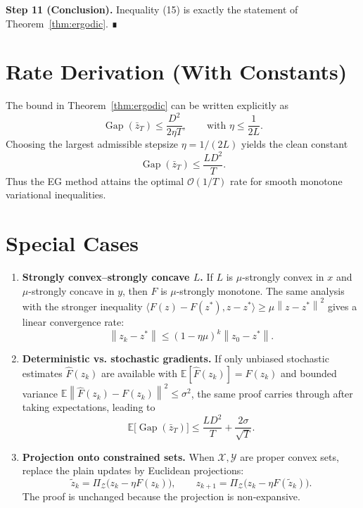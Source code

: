 \documentclass{article}
\newcommand{\norm}[1]{\left\lVert#1\right\rVert}
\newcommand{\gap}{\operatorname{Gap}}
\begin{document}
\bigskip
\noindent\textbf{Step 11 (Conclusion).} Inequality (15) is exactly the statement of Theorem~\ref{thm:ergodic}. ∎

\section*{Rate Derivation (With Constants)}
The bound in Theorem~\ref{thm:ergodic} can be written explicitly as
\[
\gap(\bar z_{T})\le
\frac{D^{2}}{2\eta T},
\qquad
\text{with }\eta\le\frac{1}{2L}.
\]
Choosing the largest admissible stepsize \(\eta=1/(2L)\) yields the clean constant
\[
\gap(\bar z_{T})\le \frac{L D^{2}}{T}.
\]
Thus the EG method attains the optimal \(\mathcal O(1/T)\) rate for smooth monotone variational inequalities.

\section*{Special Cases}
\begin{enumerate}
\item \textbf{Strongly convex–strongly concave $L$.}
If \(L\) is \(\mu\)-strongly convex in \(x\) and \(\mu\)-strongly concave in \(y\), then \(F\) is \(\mu\)-strongly monotone. The same analysis with the stronger inequality
\(\langle F(z)-F(z^{*}),z-z^{*}\rangle\ge \mu\norm{z-z^{*}}^{2}\)
gives a linear convergence rate:
\[
\norm{z_{k}-z^{*}}\le (1-\eta\mu)^{k}\norm{z_{0}-z^{*}}.
\]

\item \textbf{Deterministic vs. stochastic gradients.}
If only unbiased stochastic estimates \(\widehat F(z_{k})\) are available with
\(\mathbb{E}[\widehat F(z_{k})]=F(z_{k})\) and bounded variance
\(\mathbb{E}\norm{\widehat F(z_{k})-F(z_{k})}^{2}\le\sigma^{2}\),
the same proof carries through after taking expectations, leading to
\[
\mathbb{E}\bigl[\gap(\bar z_{T})\bigr]
\le\frac{L D^{2}}{T}+ \frac{2\sigma}{\sqrt{T}}.
\]

\item \textbf{Projection onto constrained sets.}
When \(\mathcal X,\mathcal Y\) are proper convex sets, replace the plain updates
by Euclidean projections:
\[
\tilde z_{k}= \Pi_{\mathcal Z}\!\bigl(z_{k}-\eta F(z_{k})\bigr),\qquad
z_{k+1}= \Pi_{\mathcal Z}\!\bigl(z_{k}-\eta F(\tilde z_{k})\bigr).
\]
The proof is unchanged because the projection is non‑expansive.
\end{enumerate}
\end{document}
